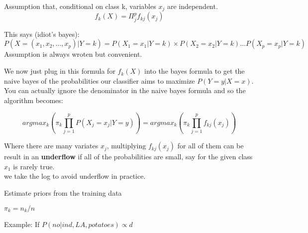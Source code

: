 \documentclass{article}
\begin{document}
Assumption that, conditional on class k, variables $x_j$ are independent. 
\[
f_k(X) = \Pi_{j}^p f_{kj}(x_j)
\]

This says (idiot's bayes):
\[
P(X=(x_1, x_2, \dots, x_p)|Y=k) = P(X_1=x_1|Y=k) \times P(X_2=x_2|Y=k) \dots P(X_p=x_p|Y=k)
\]
Assumption is always wroten but convenient.

We now just plug in this formula for $f_k(X)$ into the bayes formula to get the naive bayes of the probabilities our classifier aims to maximize $P(Y=y|X=x)$. You can actually ignore the denominator in the naive bayes formula and so the algorithm becomes: 

\[
argmax_k (\pi_k \prod_{j=1}^p P(X_j =x_j| Y=y)) 
= 
argmax_k (\pi_k \prod_{j=1}^p f_{kj}(x_j))
\]


Where there are many variates $x_j$, multiplying $f_{kj}(x_j)$ for all of them can be result in an \textbf{underflow} if all of the probabilities are small, say for the given class $x_1$ is rarely true. \\

we take the log to avoid underflow in practice.

Estimate priors from the training data

$\pi_k = n_k/n$

Example:
If $P(no| ind, LA, potatoes) \propto d$
\end{document}
